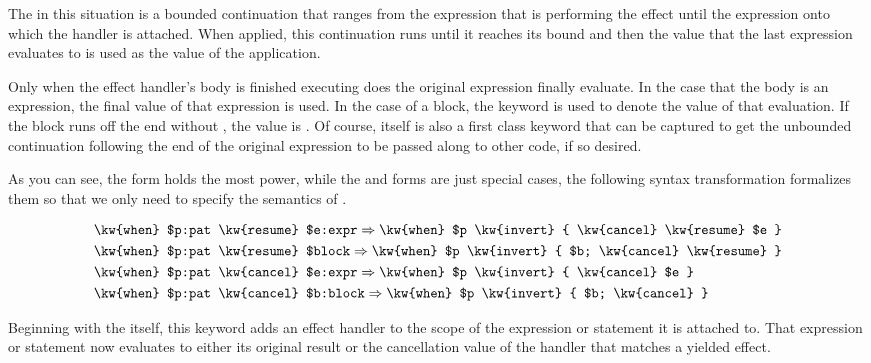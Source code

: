 The  in this situation is a bounded continuation that ranges from the
 expression that is performing the effect until the expression onto
which the handler is attached. When applied, this continuation runs until it reaches
its bound and then the value that the last expression evaluates to is used as the
value of the  application.

Only when the effect handler's body is finished executing does the original
expression finally evaluate. In the case that the body is an expression, the
final value of that expression is used. In the case of a block, the 
keyword is used to denote the value of that evaluation. If the block runs off
the end without , the value is . Of course,  itself
is also a first class keyword that can be captured to get the unbounded continuation
following the end of the original expression to be passed along to other code, if
so desired.

As you can see, the  form holds the most power, while the 
and  forms are just special cases, the following syntax transformation
formalizes them so that we only need to specify the semantics of .

\begin{align*}
    & \texttt{\kw{when} \$p:pat \kw{resume} \$e:expr} \Rightarrow \texttt{\kw{when} \$p \kw{invert} \{ \kw{cancel} \kw{resume} \$e \}} \\ %
    & \texttt{\kw{when} \$p:pat \kw{resume} \$block} \Rightarrow \texttt{\kw{when} \$p \kw{invert} \{ \$b; \kw{cancel} \kw{resume} \}} \\ %
    & \texttt{\kw{when} \$p:pat \kw{cancel} \$e:expr} \Rightarrow \texttt{\kw{when} \$p \kw{invert} \{ \kw{cancel} \$e \}} \\ %
    & \texttt{\kw{when} \$p:pat \kw{cancel} \$b:block} \Rightarrow \texttt{\kw{when} \$p \kw{invert} \{ \$b; \kw{cancel} \}} \\ %
\end{align*}

Beginning with the  itself, this keyword adds an effect handler to the scope
of the expression or statement it is attached to. That expression or statement now
evaluates to either its original result or the cancellation value of the handler that
matches a yielded effect.

\begin{prooftree}
\end{prooftree}


